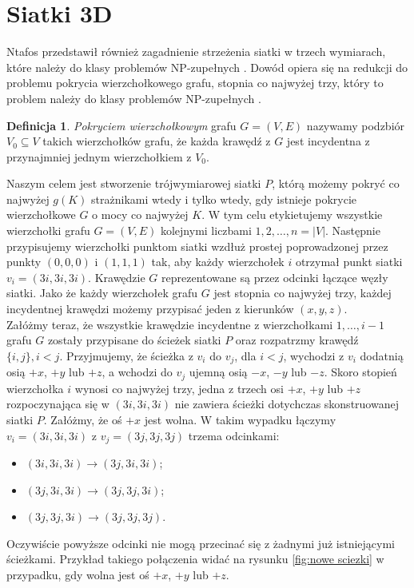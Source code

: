 \documentclass[brudnopis]{xmgr}
\theoremstyle{definition}
\newtheorem{Definicja}{Definicja}
\begin{document}
 \section{Siatki 3D}
 	Ntafos przedstawił również zagadnienie strzeżenia siatki w trzech wymiarach, które należy do klasy problemów NP-zupełnych \cite{ntafos}. Dowód opiera się na redukcji do problemu pokrycia wierzchołkowego grafu, stopnia co najwyżej trzy, który to problem należy do klasy problemów NP-zupełnych \cite{garey}.
\begin{Definicja}
	\emph{Pokryciem wierzchołkowym} grafu $G = (V,E)$ nazywamy podzbiór $V_0 \subseteq V$ takich wierzchołków grafu, że każda krawędź z $G$ jest incydentna z przynajmniej jednym wierzchołkiem z $V_0$.
\end{Definicja}
Naszym celem jest stworzenie trójwymiarowej siatki $P$, którą możemy pokryć co najwyżej $g(K)$ strażnikami wtedy i tylko wtedy, gdy istnieje pokrycie wierzchołkowe $G$ o mocy co najwyżej $K$.
W tym celu etykietujemy wszystkie wierzchołki grafu $G = (V,E)$ kolejnymi liczbami $1,2,\ldots,n = |V|$. Następnie przypisujemy wierzchołki punktom siatki wzdłuż prostej poprowadzonej przez punkty $(0,0,0)$ i $(1,1,1)$ tak, aby każdy wierzchołek $i$ otrzymał punkt siatki $v_i = (3i, 3i, 3i)$. Krawędzie $G$ reprezentowane są przez odcinki łączące węzły siatki. Jako że każdy wierzchołek grafu $G$ jest stopnia co najwyżej trzy, każdej incydentnej krawędzi możemy przypisać jeden z kierunków $(x,y,z)$.
\\\indent Załóżmy teraz, że wszystkie krawędzie incydentne z wierzchołkami $1,\ldots,i - 1$ grafu $G$ zostały przypisane do ścieżek siatki $P$ oraz rozpatrzmy krawędź $\{i,j\}, i < j$. Przyjmujemy, że ścieżka z $v_i$ do $v_j$, dla $i < j$, wychodzi z $v_i$ dodatnią osią $+x$, $+y$ lub $+z$, a wchodzi do $v_j$ ujemną osią $-x$, $-y$ lub $-z$. Skoro stopień wierzchołka $i$ wynosi co najwyżej trzy, jedna z trzech osi $+x$, $+y$ lub $+z$ rozpoczynająca się w $(3i, 3i, 3i)$ nie zawiera ścieżki dotychczas skonstruowanej siatki $P$. Załóżmy, że oś $+x$ jest wolna. W takim wypadku łączymy $v_i = (3i, 3i, 3i)$ z $v_j = (3j, 3j, 3j)$ trzema odcinkami:
\begin{itemize}
	\item $(3i, 3i, 3i) \rightarrow (3j, 3i, 3i)$;
	\item $(3j, 3i, 3i) \rightarrow (3j, 3j, 3i)$;
	\item $(3j, 3j, 3i) \rightarrow (3j, 3j, 3j)$.
\end{itemize}
Oczywiście powyższe odcinki nie mogą przecinać się z żadnymi już istniejącymi ścieżkami. Przykład takiego połączenia widać na rysunku \ref{fig:nowe sciezki} w przypadku, gdy wolna jest oś $+x$, $+y$ lub $+z$.
\end{document}

